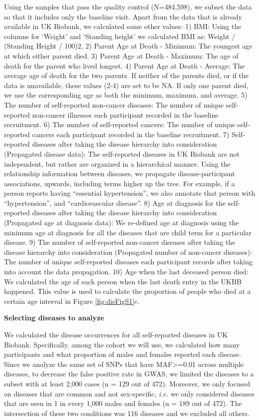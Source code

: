 \documentclass[12pt,twoside]{unicam}
\begin{document}
Using the samples that pass the quality control (N=484,598), we subset the data so that it includes only the baseline visit. Apart from the data that is already available in UK Biobank, we calculated some other values: 1) BMI: Using the columns for `Weight' and `Standing height' we calculated BMI as: Weight / (Standing Height / 100)2, 2) Parent Age at Death - Minimum: The youngest age at which either parent died. 3) Parent Age at Death - Maximum: The age of death for the parent who lived longest. 4) Parent Age at Death - Average: The average age of death for the two parents. If neither of the parents died, or if the data is unavailable, these values (2-4) are set to be NA. If only one parent died, we use the corresponding age as both the minimum, maximum, and average. 5) The number of self-reported non-cancer diseases: The number of unique self-reported non-cancer illnesses each participant recorded in the baseline recruitment. 6) The number of self-reported cancers: The number of unique self-reported cancers each participant recorded in the baseline recruitment. 7) Self-reported diseases after taking the disease hierarchy into consideration (Propagated disease data): The self-reported diseases in UK Biobank are not independent, but rather are organized in a hierarchical manner. Using the relationship information between diseases, we propagate disease-participant associations, upwards, including terms higher up the tree. For example, if a person reports having ``essential hypertension'', we also annotate that person with ``hypertension'', and ``cardiovascular disease''. 8) Age at diagnosis for the self-reported diseases after taking the disease hierarchy into consideration (Propagated age at diagnosis data): We re-defined age at diagnosis using the minimum age at diagnosis for all the diseases that are child term for a particular disease. 9) The number of self-reported non-cancer diseases after taking the disease hierarchy into consideration (Propagated number of non-cancer diseases): The number of unique self-reported diseases each participant records after taking into account the data propagation. 10) Age when the last deceased person died: We calculated the age of each person when the last death entry in the UKBB happened. This value is used to calculate the proportion of people who died at a certain age interval in Figure \ref{fig:disFigS1}c.

\textbf{Selecting diseases to analyze}

We calculated the disease occurrences for all self-reported diseases in UK Biobank. Specifically, among the cohort we will use, we calculated how many participants and what proportion of males and females reported each disease. Since we analyze the same set of SNPs that have MAF\textgreater=0.01 across multiple diseases, to decrease the false positive rate in GWAS, we limited the diseases to a subset with at least 2,000 cases (n = 129 out of 472). Moreover, we only focused on diseases that are common and not sex-specific, \emph{i.e.} we only considered diseases that are seen in 1 in every 1,000 males and females (n = 189 out of 472). The intersection of these two conditions was 116 diseases and we excluded all others.
\end{document}
